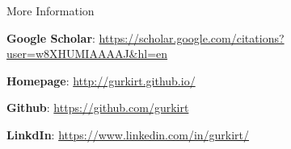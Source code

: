 \documentclass{resume_long} %
\begin{document}
\vspace{0.1in}
\begin{rSection}{More Information}{}  \itemsep -2pt
  \item \textbf{Google Scholar}: \url{https://scholar.google.com/citations?user=w8XHUMIAAAAJ&hl=en}
  \item \textbf{Homepage}: \url{http://gurkirt.github.io/}
  \item \textbf{Github}: \url{https://github.com/gurkirt}
  \item \textbf{LinkdIn}: \url{https://www.linkedin.com/in/gurkirt/}
\end{rSection}
\end{document}
